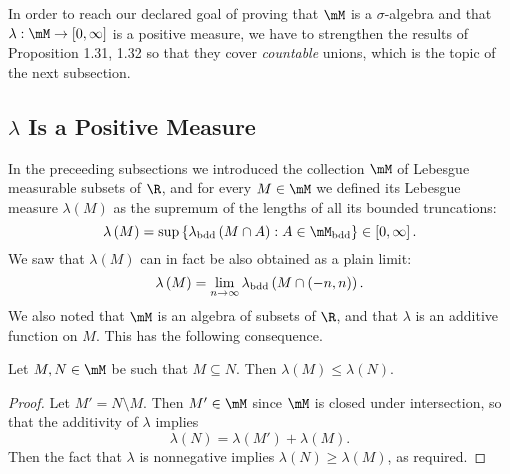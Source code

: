 \documentclass[pmath450]{subfiles}
\begin{document}
    \np In order to reach our declared goal of proving that $\mM$ is a $\sigma$-algebra and that $\lambda:\mM\to\left[ 0,\infty \right]$ is a positive measure, we have to strengthen the results of Proposition 1.31, 1.32 so that they cover \textit{countable} unions, which is the topic of the next subsection.

    \subsection{$\lambda$ Is a Positive Measure}
    
    In the preceeding subsections we introduced the collection $\mM$ of Lebesgue measurable subsets of $\R$, and for every $M\in\mM$ we defined its Lebesgue measure $\lambda\left( M \right)$ as the supremum of the lengths of all its bounded truncations:
    \begin{equation*}
        \lambda\left( M \right) = \sup\left\lbrace \lambda_{\bdd}\left( M\cap A \right): A\in\mM_{\bdd} \right\rbrace\in\left[ 0,\infty \right].
    \end{equation*}
    We saw that $\lambda\left( M \right)$ can in fact be also obtained as a plain limit:
    \begin{equation*}
        \lambda\left( M \right) = \lim_{n\to\infty}\lambda_{\operatorname{bdd}}\left( M\cap\left( -n,n \right) \right).
    \end{equation*}
    We also noted that $\mM$ is an algebra of subsets of $\R$, and that $\lambda$ is an additive function on $M$. This has the following consequence.

    \begin{prop}{}
        Let $M,N\in\mM$ be such that $M\subseteq N$. Then $\lambda\left( M \right)\leq\lambda\left( N \right)$.
    \end{prop}

    \begin{proof}
        Let $M'=N\setminus M$. Then $M'\in\mM$ since $\mM$ is closed under intersection, so that the additivity of $\lambda$ implies
        \begin{equation*}
            \lambda\left( N \right) = \lambda\left( M' \right) + \lambda\left( M \right).
        \end{equation*}
        Then the fact that $\lambda$ is nonnegative implies $\lambda\left( N \right)\geq\lambda\left( M \right)$, as required.
    \end{proof}
\end{document}
